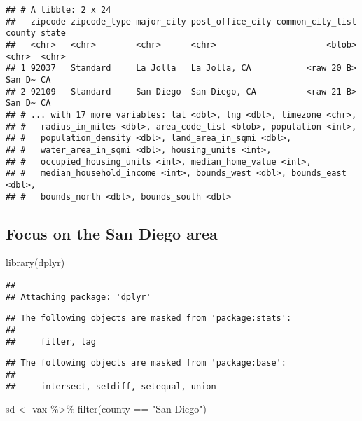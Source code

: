 \documentclass[
]{article}
\newenvironment{Shaded}{\begin{snugshade}}{\end{snugshade}}
\newcommand{\FunctionTok}[1]{\textcolor[rgb]{0.00,0.00,0.00}{#1}}
\newcommand{\NormalTok}[1]{#1}
\newcommand{\OtherTok}[1]{\textcolor[rgb]{0.56,0.35,0.01}{#1}}
\newcommand{\SpecialCharTok}[1]{\textcolor[rgb]{0.00,0.00,0.00}{#1}}
\newcommand{\StringTok}[1]{\textcolor[rgb]{0.31,0.60,0.02}{#1}}
\begin{document}
\begin{verbatim}
## # A tibble: 2 x 24
##   zipcode zipcode_type major_city post_office_city common_city_list county state
##   <chr>   <chr>        <chr>      <chr>                      <blob> <chr>  <chr>
## 1 92037   Standard     La Jolla   La Jolla, CA           <raw 20 B> San D~ CA   
## 2 92109   Standard     San Diego  San Diego, CA          <raw 21 B> San D~ CA   
## # ... with 17 more variables: lat <dbl>, lng <dbl>, timezone <chr>,
## #   radius_in_miles <dbl>, area_code_list <blob>, population <int>,
## #   population_density <dbl>, land_area_in_sqmi <dbl>,
## #   water_area_in_sqmi <dbl>, housing_units <int>,
## #   occupied_housing_units <int>, median_home_value <int>,
## #   median_household_income <int>, bounds_west <dbl>, bounds_east <dbl>,
## #   bounds_north <dbl>, bounds_south <dbl>
\end{verbatim}

\hypertarget{focus-on-the-san-diego-area}{%
\subsection{Focus on the San Diego
area}\label{focus-on-the-san-diego-area}}

\begin{Shaded}
\begin{Highlighting}[]
\FunctionTok{library}\NormalTok{(dplyr)}
\end{Highlighting}
\end{Shaded}

\begin{verbatim}
## 
## Attaching package: 'dplyr'
\end{verbatim}

\begin{verbatim}
## The following objects are masked from 'package:stats':
## 
##     filter, lag
\end{verbatim}

\begin{verbatim}
## The following objects are masked from 'package:base':
## 
##     intersect, setdiff, setequal, union
\end{verbatim}

\begin{Shaded}
\begin{Highlighting}[]
\NormalTok{sd }\OtherTok{\textless{}{-}}\NormalTok{ vax }\SpecialCharTok{\%\textgreater{}\%} 
  \FunctionTok{filter}\NormalTok{(county }\SpecialCharTok{==} \StringTok{"San Diego"}\NormalTok{)}
\end{Highlighting}
\end{Shaded}
\end{document}
